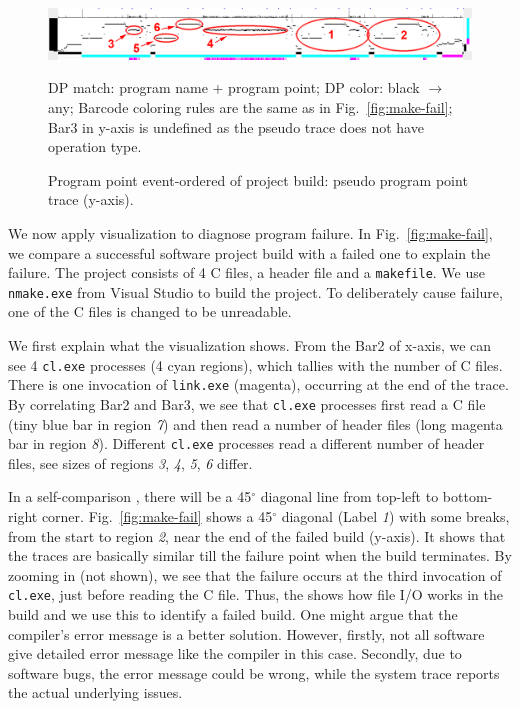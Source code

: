 \begin{figure}[htb]
\begin{center}
\includegraphics[width=1.0\textwidth]{lviz/make-pp.png}
\caption{Program point event-ordered \VDP{} of project build: pseudo program point trace (y-axis).
}
DP match: program name + program point;
DP color: black $\rightarrow$ any;
Barcode coloring rules are the same as in Fig.~\ref{fig:make-fail};
Bar3 in y-axis is undefined as the pseudo trace does not have operation type.
\label{fig:make-pp}
\end{center}
\end{figure}

We now apply visualization to diagnose program failure.
In Fig.~\ref{fig:make-fail}, we compare a successful software project build
with a failed one to explain the failure.
The project consists of 4 C files, a header file and a {\tt makefile}.
We use {\tt nmake.exe} from Visual Studio to build the project.
To deliberately cause failure, one of the C files is changed
to be unreadable.

We first explain what the visualization shows.
From the Bar2 of x-axis, 
we can see 4 {\tt cl.exe} processes (4 cyan regions), which tallies
with the number of C files.
There is one invocation of {\tt link.exe} (magenta),
occurring at the end of the trace.
By correlating Bar2 and Bar3, we see that
{\tt cl.exe} processes first read a C file (tiny blue bar in region {\em 7})
and then read a number of header files (long magenta bar in region {\em 8}).
Different {\tt cl.exe} processes read a different number of header files,
see sizes of regions {\em 3}, {\em 4}, {\em 5}, {\em 6} differ.

In a self-comparison \VDP{}, there will be a 45$^\circ$
diagonal line from top-left to bottom-right corner.
Fig.~\ref{fig:make-fail} shows a 45$^\circ$ diagonal (Label {\em 1})
with some breaks, from
the start to region {\em 2}, near the end of the failed build (y-axis).
It shows that the traces are basically similar till the failure point
when the build terminates.
By zooming in (not shown),
we see that the failure occurs at the third invocation of
{\tt cl.exe}, just before reading the C file.
Thus, the \VDP{} shows how file I/O works in the build and we use this
to identify a failed build.
One might argue that the compiler's error message is a better solution.
However, firstly,
not all software give detailed error message like the compiler in this case.
Secondly, due to software bugs, the error message could be wrong, while 
the system trace reports the actual underlying issues.

